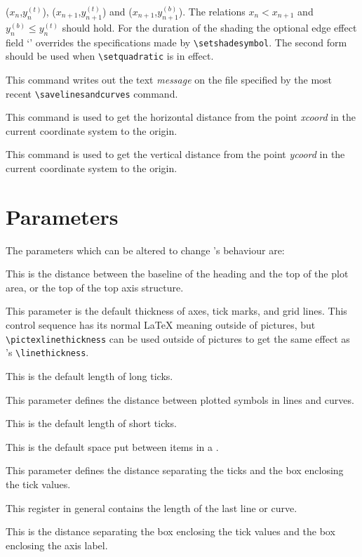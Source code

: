 \begin{syntax}
($x_n$,$y_n^{(t)}$), ($x_{n+1}$,$y_{n+1}^{(t)}$) and
($x_{n+1}$,$y_{n+1}^{(b)}$).
The relations $x_n<x_{n+1}$ and $y_n^{(b)}\leq y_n^{(t)}$
should hold. For the duration of the shading the optional edge effect field
`'
overrides the specifications made by \verb+\setshadesymbol+. The second form
should be used when \verb+\setquadratic+ is in effect.
\item[\tt\bsl writesavefile \{\emph{message}\}]
\begin{sloppypar}
This command writes out the text \emph{message} on the file specified by the
most recent \verb+\savelinesandcurves+ command.
\end{sloppypar}
\item[\tt\bsl Xdistance\{\emph{xcoord}\}]
This command is used to get the horizontal distance from the point \emph{xcoord} in
the current coordinate system to the origin.
\item[\tt\bsl Ydistance\{\emph{ycoord}\}]
This command is used to get the vertical distance from the point \emph{ycoord} in
the current coordinate system to the origin.
\end{syntax}

\section{Parameters}
The parameters which can be altered to change \PiCTeX's behaviour are:
\begin{syntax}
\item[\tt\bsl headingtoplotskip]
This is the distance between the baseline of the heading and the top of the
plot area, or the top of the top axis structure.
\item[\tt\bsl linethickness]
This parameter is the default thickness of axes, tick marks, and grid lines.
This control sequence has its normal \LaTeX{} meaning outside of \PiCTeX{}
pictures,
but \verb+\pictexlinethickness+ can be used outside of \PiCTeX{}
pictures to get the same effect as \PiCTeX's \verb+\linethickness+.
\item[\tt\bsl longticklength]
This is the default length of long ticks.
\item[\tt\bsl plotsymbolspacing]
This parameter defines the distance between plotted symbols in lines and
curves.
\item[\tt\bsl shortticklength]
This is the default length of short ticks.
\item[\tt\bsl stackleading]
This is the default space put between items in a .
\item[\tt\bsl tickstovaluesleading]
This parameter defines the distance separating the ticks and the box enclosing
the tick values.
\item[\tt\bsl totalarclength]
This register in general contains the length of the last line or curve.
\item[\tt\bsl valuestolabelleading]
This is the distance separating the box enclosing the tick values and the box
enclosing the axis label.
\end{syntax}

